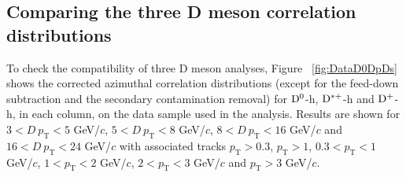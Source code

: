 \label{results}
\subsection{Comparing the three D meson correlation distributions}
To check the compatibility of three D meson analyses, Figure ~\ref{fig:DataD0DpDs} shows the corrected azimuthal correlation distributions (except for the feed-down subtraction and the secondary contamination removal) for ${\rm D^0}$-h, ${\rm D^{*+}}$-h and ${\rm D^+}$-h, in each column, on the data sample used in the analysis. Results are shown for $3 < D\ p_\text{T} < 5$ GeV/$c$, $5 < D\ p_\text{T} < 8$ GeV/$c$, $8 < D \ p_\text{T} < 16$ GeV/$c$ and $16 < D\ p_\text{T} < 24$ GeV/$c$ with associated tracks $p_\text{T} > 0.3$, $p_\text{T} > 1$, $0.3 < p_\text{T} < 1$ GeV/$c$, $1 < p_\text{T} < 2$ GeV/$c$, $2 < p_\text{T} < 3$ GeV/$c$ and $ p_\text{T} > 3$ GeV/$c$.

